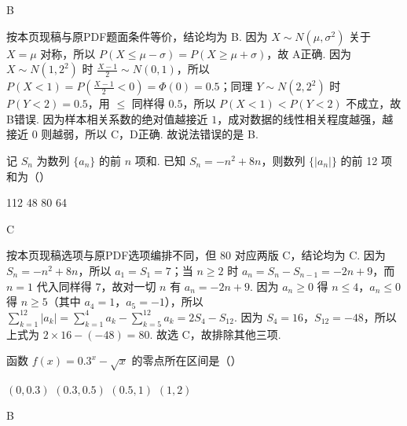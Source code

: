\begin{answer}
B
\end{answer}

\begin{solution}
按本页现稿与原PDF题面条件等价，结论均为 B. 因为 \(X\sim N\left( \mu,\sigma^{2} \right)\) 关于 \(X=\mu\) 对称，所以 \(P\left( X\le \mu-\sigma \right)=P\left( X\ge \mu+\sigma \right)\)，故 A正确. 因为 \(X\sim N\left( 1,2^{2} \right)\) 时 \(\frac{X-1}{2}\sim N\left( 0,1 \right)\)，所以 \(P\left( X<1 \right)=P\left( \frac{X-1}{2}<0 \right)=\Phi\left( 0 \right)=0.5\)；同理 \(Y\sim N\left( 2,2^{2} \right)\) 时 \(P\left( Y<2 \right)=0.5\)，用 \(\le\) 同样得 \(0.5\)，所以 \(P\left( X<1 \right)<P\left( Y<2 \right)\) 不成立，故 B错误. 因为样本相关系数的绝对值越接近 \(1\)，成对数据的线性相关程度越强，越接近 \(0\) 则越弱，所以 C，D正确. 故说法错误的是 B.
\end{solution}

\begin{problem}
记 \(S_n\) 为数列 \(\{a_n\}\) 的前 \(n\) 项和. 已知 \(S_n=-n^2+8n\)，则数列 \(\{|a_n|\}\) 的前 12 项和为（\quad）

\choices
    {112}
    {48}
    {80}
    {64}
\end{problem}

\begin{answer}
C
\end{answer}

\begin{solution}
按本页现稿选项与原PDF选项编排不同，但 \(80\) 对应两版 C，结论均为 C. 因为 \(S_{n}=-n^{2}+8n\)，所以 \(a_{1}=S_{1}=7\)；当 \(n\ge 2\) 时 \(a_{n}=S_{n}-S_{n-1}=-2n+9\)，而 \(n=1\) 代入同样得 \(7\)，故对一切 \(n\) 有 \(a_{n}=-2n+9\). 因为 \(a_{n}\ge 0\) 得 \(n\le 4\)，\(a_{n}\le 0\) 得 \(n\ge 5\)（其中 \(a_{4}=1\)，\(a_{5}=-1\)），所以 \(\sum_{k=1}^{12}\left| a_{k} \right|=\sum_{k=1}^{4}a_{k}-\sum_{k=5}^{12}a_{k}=2S_{4}-S_{12}\). 因为 \(S_{4}=16\)，\(S_{12}=-48\)，所以上式为 \(2\times 16-\left( -48 \right)=80\). 故选 C，故排除其他三项.
\end{solution}

\begin{problem}
函数 \(f(x)=0.3^x-\sqrt{x}\) 的零点所在区间是（\quad）

\choices
    {\((0,0.3)\)}
    {\((0.3,0.5)\)}
    {\((0.5,1)\)}
    {\((1,2)\)}
\end{problem}

\begin{answer}
B
\end{answer}

